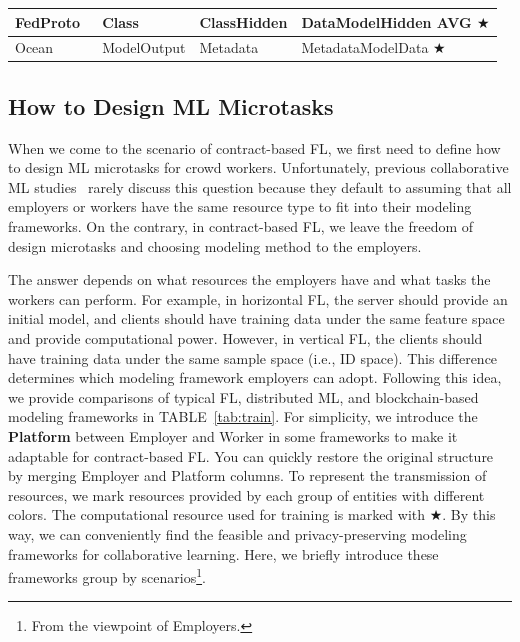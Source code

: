\begin{table}[t]
\begin{tabular}{|l|p{2.6cm}|p{4cm}|p{5cm}|}
    FedProto~\cite{tan2022fedproto, michieli2021prototype} & \colorbox{Employer!30}{Class} & \colorbox{Employer!30}{Class}\colorbox{Worker!30}{Hidden} & \colorbox{Worker!30}{Data}\colorbox{Worker!30}{Model}\colorbox{Platform!30}{Hidden AVG} $\bigstar$ \\ \hline   

    Ocean~\cite{mcconaghy2022ocean} & \colorbox{Employer!30}{Model}\colorbox{Worker!30}{Output} & \colorbox{Worker!30}{Metadata} & \colorbox{Worker!30}{Metadata}\colorbox{Employer!30}{Model}\colorbox{Worker!30}{Data} $\bigstar$ \\ \hline

    \end{tabular}
\end{table}

\subsection{How to Design ML Microtasks}
\label{sec:how2design}
When we come to the scenario of contract-based FL, we first need to define how to design ML microtasks for crowd workers. 
Unfortunately, previous collaborative ML studies~\cite{li2021survey, nguyen2021federated} rarely discuss this question because they default to assuming that all employers or workers have the same resource type to fit into their modeling frameworks.
On the contrary, in contract-based FL, we leave the freedom of design microtasks and choosing modeling method to the employers.

The answer depends on what resources the employers have and what tasks the workers can perform.
For example, in horizontal FL, the server should provide an initial model, and clients should have training data under the same feature space and provide computational power. However, in vertical FL, the clients should have training data under the same sample space (i.e., ID space). 
This difference determines which modeling framework employers can adopt. 
Following this idea, we provide comparisons of typical FL, distributed ML, and blockchain-based modeling frameworks in TABLE~\ref{tab:train}.
For simplicity, we introduce the \textbf{Platform} between Employer and Worker in some frameworks to make it adaptable for contract-based FL. 
You can quickly restore the original structure by merging Employer and Platform columns.
To represent the transmission of resources, we mark resources provided by each group of entities with different colors.
The computational resource used for training is marked with $\bigstar$.
By this way, we can conveniently find the feasible and privacy-preserving modeling frameworks for collaborative learning. 
Here, we briefly introduce these frameworks group by scenarios\footnote{From the viewpoint of Employers.}.

